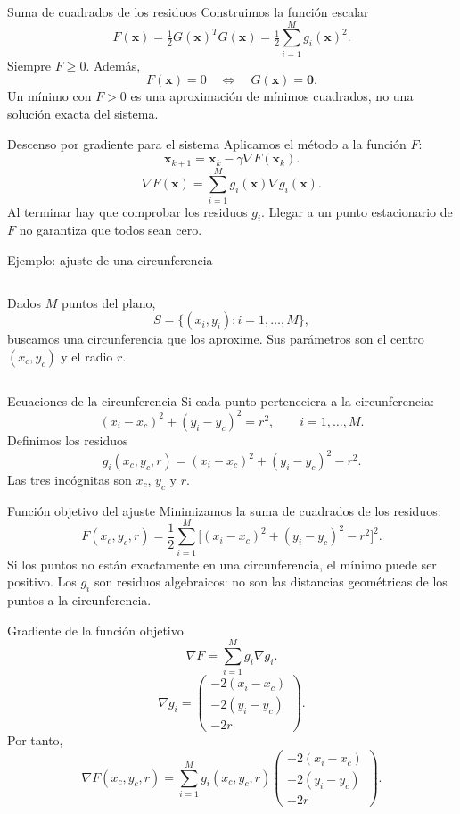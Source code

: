 \documentclass[original_version/main.tex]{subfiles}
\begin{document}
\begin{frame}[t]{Suma de cuadrados de los residuos}
Construimos la función escalar
\[\boxed{F(\boldsymbol{x})=\tfrac12G(\boldsymbol{x})^TG(\boldsymbol{x})
=\tfrac12\sum_{i=1}^M g_i(\boldsymbol{x})^2}.\]
Siempre $F\ge0$. Además,
\[F(\boldsymbol{x})=0\quad\Longleftrightarrow\quad G(\boldsymbol{x})=\boldsymbol{0}.\]
Un mínimo con $F>0$ es una aproximación de mínimos cuadrados, no una solución exacta del sistema.
\end{frame}
\begin{frame}[t]{Descenso por gradiente para el sistema}
Aplicamos el método a la función $F$:
\[\boldsymbol{x}_{k+1}=\boldsymbol{x}_k-\gamma\nabla F(\boldsymbol{x}_k).\]
\[\nabla F(\boldsymbol{x})=\sum_{i=1}^M g_i(\boldsymbol{x})\nabla g_i(\boldsymbol{x}).\]
Al terminar hay que comprobar los residuos $g_i$. Llegar a un punto estacionario de $F$ no garantiza que todos sean cero.
\end{frame}
\begin{frame}[t]{Ejemplo: ajuste de una circunferencia}
\begin{columns}\small
Dados $M$ puntos del plano,
\[S=\{(x_i,y_i):i=1,\ldots,M\},\]
buscamos una circunferencia que los aproxime.
\medskip Sus parámetros son el centro $(x_c,y_c)$ y el radio $r$.
\end{columns}
\end{frame}
\begin{frame}[t]{Ecuaciones de la circunferencia}
Si cada punto perteneciera a la circunferencia:
\[(x_i-x_c)^2+(y_i-y_c)^2=r^2,\qquad i=1,\ldots,M.\]
Definimos los residuos
\[\boxed{g_i(x_c,y_c,r)=(x_i-x_c)^2+(y_i-y_c)^2-r^2}.\]
Las tres incógnitas son $x_c$, $y_c$ y $r$.
\end{frame}
\begin{frame}[t]{Función objetivo del ajuste}
\small
Minimizamos la suma de cuadrados de los residuos:
\[F(x_c,y_c,r)=\frac12\sum_{i=1}^M
\big[(x_i-x_c)^2+(y_i-y_c)^2-r^2\big]^2.\]
Si los puntos no están exactamente en una circunferencia, el mínimo puede ser positivo.
\medskip
Los $g_i$ son residuos algebraicos: no son las distancias geométricas de los puntos a la circunferencia.
\end{frame}
\begin{frame}[t]{Gradiente de la función objetivo}
\small
\[\nabla F=\sum_{i=1}^M g_i\nabla g_i.\]
\[\nabla g_i=
\begin{pmatrix}-2(x_i-x_c)\\-2(y_i-y_c)\\-2r\end{pmatrix}.\]
Por tanto,
\[\boxed{\nabla F(x_c,y_c,r)=\sum_{i=1}^M
 g_i(x_c,y_c,r)\begin{pmatrix}-2(x_i-x_c)\\-2(y_i-y_c)\\-2r\end{pmatrix}}.\]
\end{frame}
\end{document}
